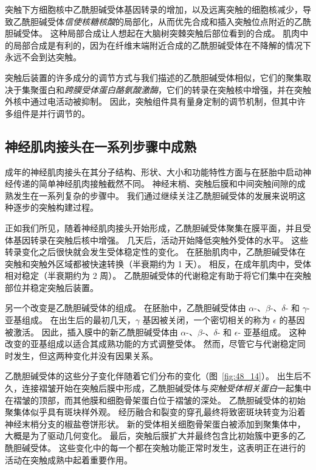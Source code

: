 突触下方细胞核中乙酰胆碱受体基因转录的增加，以及远离突触的细胞核减少，导致乙酰胆碱受体\textit{信使核糖核酸}的局部化，从而优先合成和插入突触位点附近的乙酰胆碱受体。
这种局部合成让人想起在大脑树突棘突触后部位看到的合成。
肌肉中的局部合成是有利的，因为在纤维末端附近合成的乙酰胆碱受体在不降解的情况下永远不会到达突触。


突触后装置的许多成分的调节方式与我们描述的乙酰胆碱受体相似，它们的聚集取决于集聚蛋白和\textit{跨膜受体蛋白酪氨酸激酶}，它们的转录在突触核中增强，并在突触外核中通过电活动被抑制。
因此，突触组件具有量身定制的调节机制，但其中许多组件是并行调节的。



\subsection{神经肌肉接头在一系列步骤中成熟}

成年的神经肌肉接头在其分子结构、形状、大小和功能特性方面与在胚胎中启动神经传递的简单神经肌肉接触截然不同。
神经末梢、突触后膜和中间突触间隙的成熟发生在一系列复杂的步骤中。
我们通过继续关注乙酰胆碱受体的发展来说明这种逐步的突触构建过程。


正如我们所见，随着神经肌肉接头开始形成，乙酰胆碱受体聚集在膜平面，并且受体基因转录在突触后核中增强。
几天后，活动开始降低突触外受体的水平。
这些转录变化之后很快就会发生受体稳定性的变化。
在胚胎肌肉中，乙酰胆碱受体在突触和突触外区域都被快速转换（半衰期约为 1 天）。
相反，在成年肌肉中，受体相对稳定（半衰期约为 2 周）。
乙酰胆碱受体的代谢稳定有助于将它们集中在突触部位并稳定突触后装置。


另一个改变是乙酰胆碱受体的组成。
在胚胎中，乙酰胆碱受体由 $ \alpha $-、$ \beta $-、$ \delta $- 和 $ \gamma $- 亚基组成。
在出生后的最初几天，$ \gamma $ 基因被关闭，一个密切相关的称为 $ \epsilon $ 的基因被激活。
因此，插入膜中的新乙酰胆碱受体由 $ \alpha $-、$ \beta $-、$ \delta $- 和 $ \epsilon $- 亚基组成。
这种改变的亚基组成以适合其成熟功能的方式调整受体。
然而，尽管它与代谢稳定同时发生，但这两种变化并没有因果关系。


乙酰胆碱受体的这些分子变化伴随着它们分布的变化（图~\ref{fig:48_14}）。
出生后不久，连接褶皱开始在突触后膜中形成，乙酰胆碱受体与\textit{突触受体相关蛋白}一起集中在褶皱的顶部，而其他膜和细胞骨架蛋白位于褶皱的深处。
乙酰胆碱受体的初始聚集体似乎具有斑块样外观。
经历融合和裂变的穿孔最终将致密斑块转变为沿着神经末梢分支的椒盐卷饼形状。
新的受体相关细胞骨架蛋白被添加到聚集体中，大概是为了驱动几何变化。
最后，突触后膜扩大并最终包含比初始簇中更多的乙酰胆碱受体。
这些变化中的每一个都在突触功能正常时发生，这表明正在进行的活动在突触成熟中起着重要作用。


